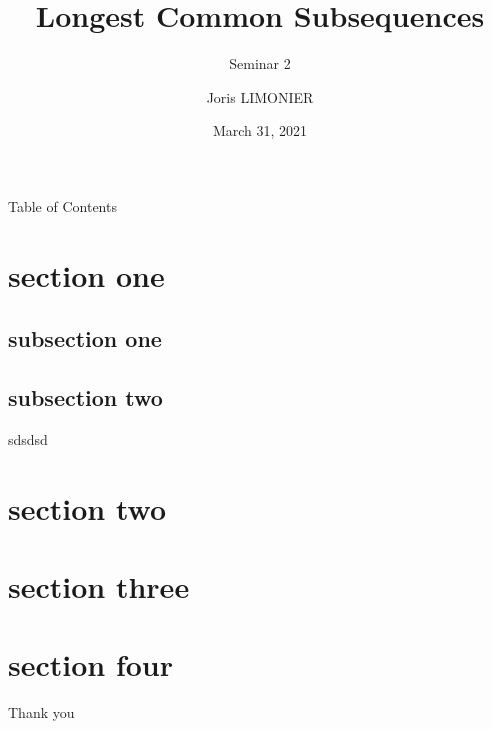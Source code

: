 \documentclass{beamer}
\title{Longest Common Subsequences}
\subtitle{Seminar 2}
\author{Joris LIMONIER}
\institute{University of Luxembourg}
\date{March 31, 2021}
\begin{document}
\begin{frame}[plain]
    \maketitle
\end{frame}

\begin{frame}{Table of Contents}
    \tableofcontents
\end{frame}


\section{section one}
\subsection{subsection one}
\begin{frame}
\end{frame}

\begin{frame}
\end{frame}

\begin{frame}
\end{frame}

\begin{frame}
\end{frame}

\subsection{subsection two}
\begin{frame}
    sdsdsd
\end{frame}

\begin{frame}
\end{frame}

\section{section two}

\begin{frame}
\end{frame}

\section{section three}

\begin{frame}
\end{frame}

\section{section four}

\begin{frame}
\end{frame}

\begin{frame}
\end{frame}

\begin{frame}
\end{frame}

\begin{frame}[standout]
    Thank you
\end{frame}
\end{document}
